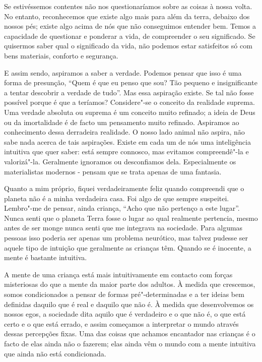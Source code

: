 Se estivéssemos contentes não nos questionaríamos sobre as coisas à nossa volta.
No entanto, reconhecemos que existe algo mais para além da terra, debaixo dos
nossos pés; existe algo acima de nós que não conseguimos entender bem. Temos a
capacidade de questionar e ponderar a vida, de compreender o seu significado. Se
quisermos saber qual o significado da vida, não podemos estar satisfeitos só com
bens materiais, conforto e segurança.

E assim sendo, aspiramos a saber a verdade. Podemos pensar que isso é uma forma
de presunção, “Quem é que eu penso que sou? Tão pequeno e insignificante a
tentar descobrir a verdade de tudo”. Mas essa aspiração existe. Se tal não fosse
possível porque é que a teríamos? Considere"-se o conceito da realidade suprema.
Uma verdade absoluta ou suprema é um conceito muito refinado; a ideia de Deus ou
da imortalidade é de facto um pensamento muito refinado. Aspiramos ao
conhecimento dessa derradeira realidade. O nosso lado animal não aspira, não
sabe nada acerca de tais aspirações. Existe em cada um de nós uma inteligência
intuitiva que quer saber: está sempre connosco, mas evitamos compreendê"-la e
valorizá"-la. Geralmente ignoramos ou desconfiamos dela. Especialmente os
materialistas modernos - pensam que se trata apenas de uma fantasia.

Quanto a mim próprio, fiquei verdadeiramente feliz quando compreendi que o
planeta não é a minha verdadeira casa. Foi algo de que sempre suspeitei.
Lembro"-me de pensar, ainda criança, “Acho que não pertenço a este lugar”. Nunca
senti que o planeta Terra fosse o lugar ao qual realmente pertencia, mesmo
antes de ser monge nunca senti que me integrava na sociedade. Para algumas
pessoas isso poderia ser apenas um problema neurótico, mas talvez pudesse ser
aquele tipo de intuição que geralmente as crianças têm. Quando se é inocente, a
mente é bastante intuitiva.

A mente de uma criança está mais intuitivamente em
contacto com forças misteriosas do que a mente da maior parte dos adultos. À
medida que crescemos, somos condicionados a pensar de formas pré"-determinadas e
a ter ideias bem definidas daquilo que é real e daquilo que não é. À medida que
desenvolvemos os nossos egos, a sociedade dita aquilo que é verdadeiro e o que
não é, o que está certo e o que está errado, e assim começamos a interpretar o
mundo através dessas percepções fixas. Uma das coisas que achamos encantador nas
crianças é o facto de elas ainda não o fazerem; elas ainda vêm o mundo com a
mente intuitiva que ainda não está condicionada.

